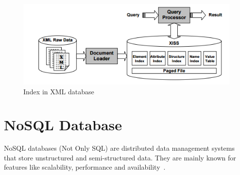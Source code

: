 \documentclass[a4paper,12pt]{book}
\begin{document}
\begin{figure}[h]
    \includegraphics[width=1\textwidth]{img/Indexing}
    \caption{Index in XML
    database~\cite{li2001indexing}}
    \label{fig:xml-indexes}
\end{figure}

	\section{NoSQL Database}
	NoSQL databases (Not Only SQL) are distributed data management systems that store unstructured and semi-structured data. They are mainly known for features like scalability, performance and availability~\citep{hecht2011nosql}.
	
\end{document}
